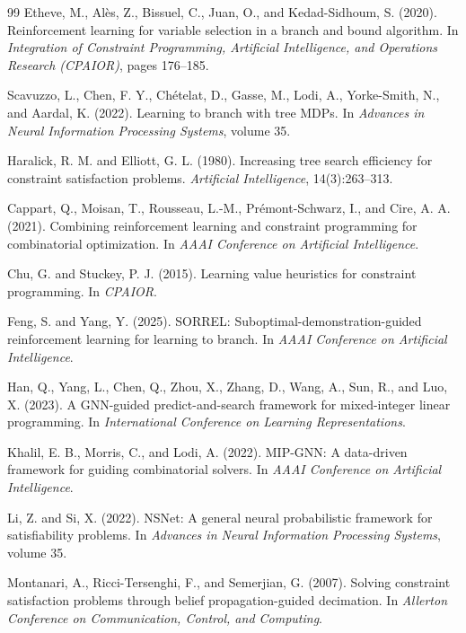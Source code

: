 \documentclass[preprint,12pt]{elsarticle}
\begin{document}
\begin{thebibliography}{99}
Etheve, M., Al\`es, Z., Bissuel, C., Juan, O., and Kedad-Sidhoum, S. (2020).
Reinforcement learning for variable selection in a branch and bound algorithm.
In \emph{Integration of Constraint Programming, Artificial Intelligence, and Operations Research (CPAIOR)}, pages 176--185.

Scavuzzo, L., Chen, F. Y., Ch\'etelat, D., Gasse, M., Lodi, A., Yorke-Smith, N., and Aardal, K. (2022).
Learning to branch with tree MDPs.
In \emph{Advances in Neural Information Processing Systems}, volume 35.

Haralick, R. M. and Elliott, G. L. (1980).
Increasing tree search efficiency for constraint satisfaction problems.
\emph{Artificial Intelligence}, 14(3):263--313.

Cappart, Q., Moisan, T., Rousseau, L.-M., Pr\'emont-Schwarz, I., and Cire, A. A. (2021).
Combining reinforcement learning and constraint programming for combinatorial optimization.
In \emph{AAAI Conference on Artificial Intelligence}.

Chu, G. and Stuckey, P. J. (2015).
Learning value heuristics for constraint programming.
In \emph{CPAIOR}.

Feng, S. and Yang, Y. (2025).
SORREL: Suboptimal-demonstration-guided reinforcement learning for learning to branch.
In \emph{AAAI Conference on Artificial Intelligence}.

Han, Q., Yang, L., Chen, Q., Zhou, X., Zhang, D., Wang, A., Sun, R., and Luo, X. (2023).
A GNN-guided predict-and-search framework for mixed-integer linear programming.
In \emph{International Conference on Learning Representations}.

Khalil, E. B., Morris, C., and Lodi, A. (2022).
MIP-GNN: A data-driven framework for guiding combinatorial solvers.
In \emph{AAAI Conference on Artificial Intelligence}.

Li, Z. and Si, X. (2022).
NSNet: A general neural probabilistic framework for satisfiability problems.
In \emph{Advances in Neural Information Processing Systems}, volume 35.

Montanari, A., Ricci-Tersenghi, F., and Semerjian, G. (2007).
Solving constraint satisfaction problems through belief propagation-guided decimation.
In \emph{Allerton Conference on Communication, Control, and Computing}.


\end{thebibliography}
\end{document}
